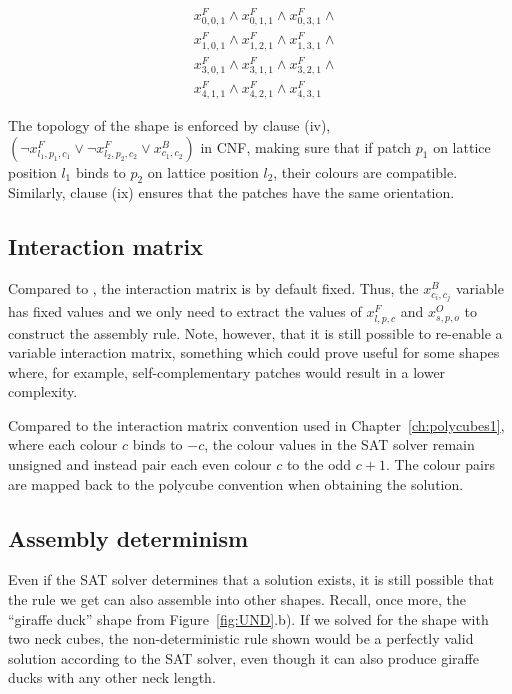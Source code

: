 \begin{equation}
    \begin{aligned}
        &x_{0,0,1}^{F} \land x_{0,1,1}^{F} \land x_{0,3,1}^{F} \land \\
        &x_{1,0,1}^{F} \land x_{1,2,1}^{F} \land x_{1,3,1}^{F} \land \\
        &x_{3,0,1}^{F} \land x_{3,1,1}^{F} \land x_{3,2,1}^{F} \land \\
        &x_{4,1,1}^{F} \land x_{4,2,1}^{F} \land x_{4,3,1}^{F}
    \end{aligned}
\end{equation}

The topology of the shape is enforced by clause (iv), \(\left(\lnot x_{l_1, p_1, c_1}^{F} \lor \lnot x_{l_2, p_2, c_2}^{F} \lor x_{c_1, c_2}^{B}\right)\) in CNF, making sure that if patch \(p_1\) on lattice position \(l_1\) binds to \(p_2\) on lattice position \(l_2\), their colours are compatible. Similarly, clause (ix) ensures that the patches have the same orientation.


\subsection{Interaction matrix}
Compared to \cite{romano2020designing}, the interaction matrix is by default fixed. Thus, the \(x_{c_i,c_j}^{B}\) variable has fixed values and we only need to extract the values of \(x_{l,p,c}^{F}\) and \(x_{s,p,o}^{O}\) to construct the assembly rule. Note, however, that it is still possible to re-enable a variable interaction matrix, something which could prove useful for some shapes where, for example, self-complementary patches would result in a lower complexity.

Compared to the interaction matrix convention used in Chapter~\ref{ch:polycubes1}, where each colour \(c\) binds to \(-c\), the colour values in the SAT solver remain unsigned and instead pair each even colour \(c\) to the odd \(c+1\). The colour pairs are mapped back to the polycube convention when obtaining the solution.

\subsection{Assembly determinism}
Even if the SAT solver determines that a solution exists, it is still possible that the rule we get can also assemble into other shapes. Recall, once more, the ``giraffe duck'' shape from Figure~\ref{fig:UND}.b). If we solved for the shape with two neck cubes, the non-deterministic rule shown would be a perfectly valid solution according to the SAT solver, even though it can also produce giraffe ducks with any other neck length.

